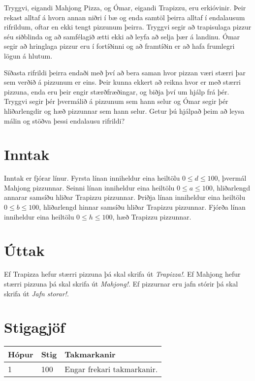 Tryggvi, eigandi Mahjong Pizza, og Ómar, eigandi Trapizzu, eru erkióvinir. 
Þeir rekast alltaf á hvorn annan niðri í bæ og enda samtöl þeirra alltaf í endalausum rifrildum, oftar en ekki tengt pizzunum þeirra.
Tryggvi segir að trapisulaga pizzur séu siðblinda og að samfélagið ætti ekki að leyfa að selja þær á landinu.
Ómar segir að hringlaga pizzur eru í fortíðinni og að framtíðin er að hafa frumlegri lögun á hlutum.

Síðasta rifrildi þeirra endaði með því að bera saman hvor pizzan væri stærri þar sem verðið á pizzunum er eins.
Þeir kunna ekkert að reikna hvor er með stærri pizzuna, enda eru þeir engir stærðfræðingar, og biðja því um hjálp frá þér.
Tryggvi segir þér þvermálið á pizzunum sem hann selur og Ómar segir þér hliðarlengdir og hæð pizzunnar sem hann selur.
Getur þú hjálpað þeim að leysa málin og stöðva þessi endalausu rifrildi?

\section*{Inntak}
Inntak er fjórar línur. Fyrsta línan inniheldur eina heiltölu $0 \leq d \leq 100$, þvermál Mahjong pizzunnar.
Seinni línan inniheldur eina heiltölu $0 \leq a \leq 100$, hliðarlengd annarar samsíðu hliðar Trapizzu pizzunnar.
Þriðja línan inniheldur eina heiltölu $0 \leq b \leq 100$, hliðarlengd hinnar samsíðu hliðar Trapizzu pizzunnar.
Fjórða línan inniheldur eina heiltölu $0 \leq h \leq 100$, hæð Trapizzu pizzunnar.

\section*{Úttak}
Ef Trapizza hefur stærri pizzuna þá skal skrifa út \textit{Trapizza!}. Ef Mahjong hefur stærri pizzuna þá skal skrifa út \textit{Mahjong!}.
Ef pizzurnar eru jafn stórir þá skal skrifa út \textit{Jafn storar!}.

\section*{Stigagjöf}
\begin{tabular}{|l|l|l|}
\hline
Hópur & Stig & Takmarkanir \\ \hline
1     & 100   & Engar frekari takmarkanir. \\ \hline
\end{tabular}
